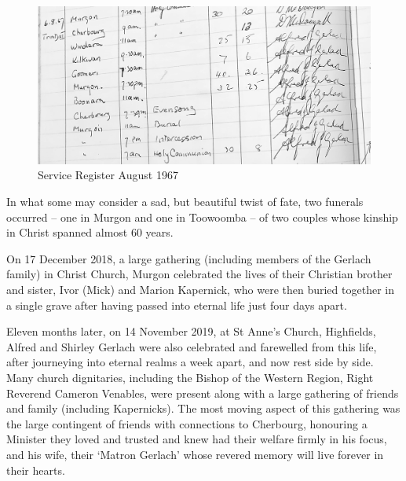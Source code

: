 \begin{figure}
\begin{center}
\includegraphics[width=1.\linewidth,center]{../images/serviceRegisterAug1967.jpg}
\caption{Service Register August 1967}
\end{center}
\end{figure}




In what some may consider a sad, but beautiful twist of fate, two funerals occurred -- one in Murgon and one in Toowoomba -- of two couples whose kinship in Christ spanned almost 60 years.



On 17 December 2018, a large gathering (including members of the Gerlach family) in Christ Church, Murgon celebrated the lives of their Christian brother and sister, Ivor (Mick) and Marion Kapernick, who were then buried together in a single grave after having passed into eternal life just four days apart.



Eleven months later, on 14 November 2019, at St Anne's Church, Highfields, Alfred and Shirley Gerlach were also celebrated and farewelled from this life, after journeying into eternal realms a week apart, and now rest side by side. Many church dignitaries, including the Bishop of the Western Region, Right Reverend Cameron Venables, were present along with a large gathering of friends and family (including Kapernicks). The most moving aspect of this gathering was the large contingent of friends with connections to Cherbourg, honouring a Minister they loved and trusted and knew had their welfare firmly in his focus, and his wife, their `Matron Gerlach' whose revered memory will live forever in their hearts.



